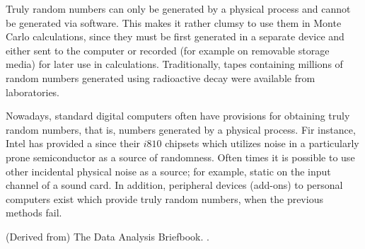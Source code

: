 \documentclass{article}
\begin{document}
Truly random numbers can only be generated by a physical process and cannot be generated via software. This makes it rather clumsy to use them in Monte Carlo calculations, since they must be first generated in a separate device and either sent to the computer or recorded (for example on removable storage media) for later use in calculations. Traditionally, tapes containing millions of random  numbers generated using radioactive decay were available from laboratories.  

Nowadays, standard digital computers often have provisions for obtaining truly random numbers, that is, numbers generated by a physical process.  Fir instance, Intel has provided a  since their $i810$ chipsets which utilizes noise in a particularly prone semiconductor as a source of randomness.  Often times it is possible to use other incidental physical noise as a source; for example, static on the input channel of a sound card.  In addition, peripheral devices (add-ons) to personal computers exist which provide truly random numbers, when the previous methods fail.

\begin{thebibliography}{3}

\bibitem (Derived from) The Data Analysis Briefbook.  .

\end{thebibliography}
\end{document}
